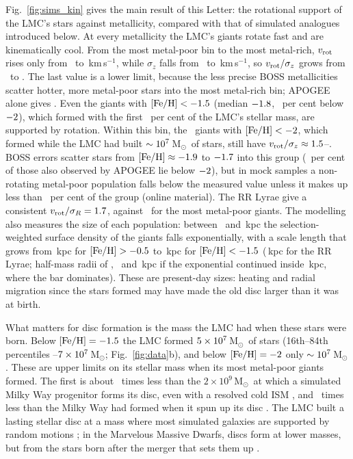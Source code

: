 \documentclass[fleqn,usenatbib,letters]{mnras}
\newcommand{\feh}{[{\rm Fe/H}]}
\newcommand{\kms}{\,km\,s$^{-1}$}
\newcommand{\Msun}{\,M$_\odot$}
\begin{document}
Fig.~\ref{fig:sims_kin} gives the main result of this Letter: the
rotational support of the LMC's stars against metallicity, compared
with that of simulated analogues introduced below. At every
metallicity the LMC's giants rotate fast and are kinematically cool.
From the most metal-poor bin to the most metal-rich, $v_{\rm rot}$
rises only from \ltKinVrotMP\ to \ltKinVrotMR\kms, while $\sigma_z$
falls from \ltKinSigMP\ to \ltKinSigMR\kms, so $v_{\rm rot}/\sigma_z$
grows from \ltKinRatioMP\ to \ltKinRatioMR. The last value is a lower
limit, because the less precise BOSS metallicities
scatter hotter, more metal-poor stars into the most metal-rich bin; APOGEE alone
gives \ltKinRatioMRApo. Even the giants
with $\feh<\ltFehA$ (median $-1.8$, \ltMPPctLow\ per cent below
$-2$), which formed with the first \ltFirstFrac\ per cent of
the LMC's stellar mass, are supported by rotation. Within this bin, the
\ltLowN\ giants with $\feh<\ltLowFeh$, which formed while the LMC had
built $\sim10^{7}$\Msun\ of stars, still have
$v_{\rm rot}/\sigma_z\approx1.5$--\ltLowRatioHi. BOSS errors
scatter stars from $\feh\approx\ltLowInterLo$ to $-1.7$ into this group
(\ltLowPurity\ per cent of those also observed by APOGEE lie below
$-2$), but in mock samples a non-rotating metal-poor population
falls below the measured value unless it makes up less than
\ltLowPurityMin\ per cent of the group (online material). The RR Lyrae give a consistent
$v_{\rm rot}/\sigma_R=1.7$, against \ltKinRatioRMP\ for the
most metal-poor giants. The modelling also measures the size of each
population: between \ltHFitLo\ and \ltHFitHi\,kpc the selection-weighted
surface density of the giants falls exponentially, with a scale length
that grows from \ltHMR\,kpc for $\feh>\ltFehD$ to \ltHMP\,kpc for
$\feh<\ltFehA$ (\ltHRrl\,kpc for the RR Lyrae; half-mass radii of
\ltReMR, \ltReMP\ and \ltReRrl\,kpc if the exponential continued inside
\ltHFitLo\,kpc, where the bar dominates). These are present-day sizes:
heating and radial migration since the stars formed may have made the
old disc larger than it was at birth.

What matters for disc formation is the mass the LMC had when these
stars were born. Below $\feh=\ltFehA$ the LMC formed
$5\times10^{7}$\Msun\ of stars (16th--84th percentiles
\ltEarlyMassLo--$7\times10^{7}$\Msun;
Fig.~\ref{fig:data}b), and below $\feh=\ltLowFeh$ only $\sim10^{7}$\Msun.
These are upper limits on its stellar mass when its most
metal-poor giants formed. The first is about \ltEarlyRatio\ times less than the
$2\times10^9$\Msun\ at which a simulated Milky Way progenitor forms its
disc, even with a resolved cold ISM \citep{Semenov2025a}, and
\ltEarlyRatioMW\ times less than the Milky Way had formed when it spun
up its disc \citep{Belokurov2023,Kurbatov2024}. The LMC built a lasting
stellar disc at a mass where most simulated galaxies are supported by
random motions \citep{ElBadry2018,Dekel2020}; in the Marvelous Massive
Dwarfs, discs form at lower masses, but from the stars born after the
merger that sets them up \citep{Geda2026}.
\end{document}
